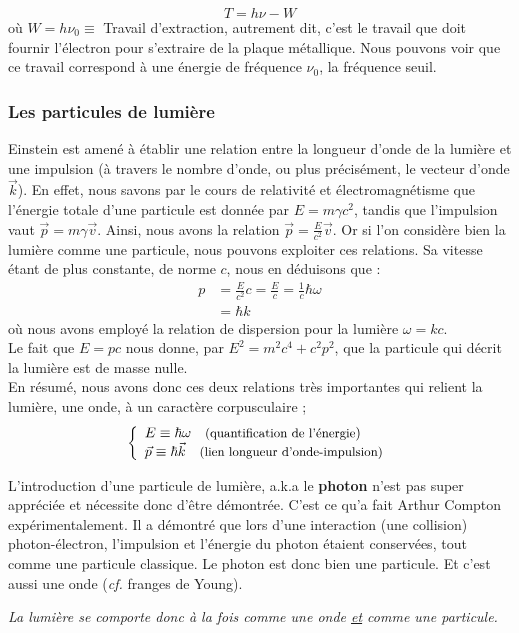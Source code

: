 \documentclass[12pt, a4paper]{book}
\begin{document}
$$ T = h\nu - W$$
où $W = h \nu_0 \equiv$ Travail d'extraction, autrement dit, c'est le travail que doit fournir l'électron pour s'extraire de la plaque métallique. Nous pouvons voir que ce travail correspond à une énergie de fréquence $\nu_0$, la fréquence seuil. 

\subsubsection{Les particules de lumière}
Einstein est amené à établir une relation entre la longueur d'onde de la lumière et une impulsion (à travers le nombre d'onde, ou plus précisément, le vecteur d'onde $\vec{k}$).
En effet, nous savons par le cours de relativité et électromagnétisme que l'énergie totale d'une particule est donnée par $E = m \gamma c^2$, tandis que l'impulsion vaut $\vec{p} = m \gamma \vec{v}$. Ainsi, nous avons la relation $\vec{p} = \frac{E}{c^2} \vec{v}$. 
Or si l'on considère bien la lumière comme une particule, nous pouvons exploiter ces relations. Sa vitesse étant de plus constante, de norme $c$, nous en déduisons que : 
\begin{align*}
  p &= \frac{E}{c^2} c = \frac{E}{c} = \frac{1}{c} \hbar \omega \\
  &= \hbar k 
\end{align*}
où nous avons employé la relation de dispersion pour la lumière $\omega = kc$. \\
Le fait que $E = pc$ nous donne, par $E^2 = m^2 c^4 + c^2 p^2$, que la particule qui décrit la lumière est de masse nulle. \\
En résumé, nous avons donc ces deux relations très importantes qui relient la lumière, une onde, à un caractère corpusculaire ; 
\begin{align}
\label{Quantification energie et impulsion}
\left\{ \begin{array}{l}
E \equiv \hbar \omega \quad \text{\small (quantification de l'énergie}) \\
\vec{p} \equiv \hbar \vec{k}  \quad \text{\small (lien longueur d'onde-impulsion)}
\end{array} \right.
\end{align}

L'introduction d'une particule de lumière, a.k.a le \textbf{photon} n'est pas super appréciée et nécessite donc d'être démontrée. C'est ce qu'a fait Arthur Compton expérimentalement. Il a démontré que lors d'une interaction (une collision) photon-électron, l'impulsion et l'énergie du photon étaient conservées, tout comme une particule classique. Le photon est donc bien une particule. Et c'est aussi une onde (\textit{cf.} franges de Young). 
\begin{center}
\begin{large}
\textit{La lumière se comporte donc à la fois comme une onde \underline{et} comme une particule.}
\end{large}
\end{center}
\end{document}
